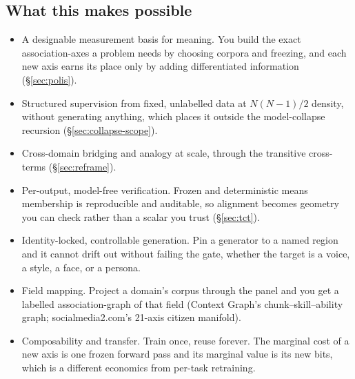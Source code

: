 \documentclass[10pt,twocolumn]{article}
\begin{document}
\subsection{What this makes possible}
\begin{itemize}\itemsep0.12em
\item A designable measurement basis for meaning. You build the exact
association-axes a problem needs by choosing corpora and freezing, and each new
axis earns its place only by adding differentiated information
(\S\ref{sec:polis}).
\item Structured supervision from fixed, unlabelled data at $N(N-1)/2$ density,
without generating anything, which places it outside the model-collapse recursion
(\S\ref{sec:collapse-scope}).
\item Cross-domain bridging and analogy at scale, through the transitive
cross-terms (\S\ref{sec:reframe}).
\item Per-output, model-free verification. Frozen and deterministic means
membership is reproducible and auditable, so alignment becomes geometry you can
check rather than a scalar you trust (\S\ref{sec:tct}).
\item Identity-locked, controllable generation. Pin a generator to a named region
and it cannot drift out without failing the gate, whether the target is a voice,
a style, a face, or a persona.
\item Field mapping. Project a domain's corpus through the panel and you get a
labelled association-graph of that field (Context Graph's
chunk--skill--ability graph; socialmedia2.com's 21-axis citizen manifold).
\item Composability and transfer. Train once, reuse forever. The marginal cost of
a new axis is one frozen forward pass and its marginal value is its new bits,
which is a different economics from per-task retraining.
\end{itemize}
\end{document}
